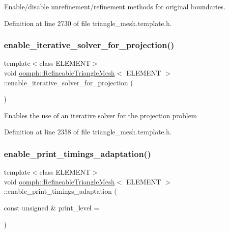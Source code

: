 Enable/disable unrefinement/refinement methods for original boundaries. 



Definition at line 2730 of file triangle\+\_\+mesh.\+template.\+h.

\mbox{\label{classoomph_1_1RefineableTriangleMesh_aa0e6f48ae67efc2931c03ca22eaa9ca0}} 
\subsubsection{\texorpdfstring{enable\+\_\+iterative\+\_\+solver\+\_\+for\+\_\+projection()}{enable\_iterative\_solver\_for\_projection()}}
{\footnotesize\ttfamily template$<$class E\+L\+E\+M\+E\+NT$>$ \\
void \hyperlink{classoomph_1_1RefineableTriangleMesh}{oomph\+::\+Refineable\+Triangle\+Mesh}$<$ E\+L\+E\+M\+E\+NT $>$\+::enable\+\_\+iterative\+\_\+solver\+\_\+for\+\_\+projection (\begin{DoxyParamCaption}{ }\end{DoxyParamCaption})\hspace{0.3cm}{\ttfamily [inline]}}

Enables the use of an iterative solver for the projection problem 

Definition at line 2358 of file triangle\+\_\+mesh.\+template.\+h.

\mbox{\label{classoomph_1_1RefineableTriangleMesh_a53f7ac7fbe9fdde0fb52b634d7370221}} 
\subsubsection{\texorpdfstring{enable\+\_\+print\+\_\+timings\+\_\+adaptation()}{enable\_print\_timings\_adaptation()}}
{\footnotesize\ttfamily template$<$class E\+L\+E\+M\+E\+NT$>$ \\
void \hyperlink{classoomph_1_1RefineableTriangleMesh}{oomph\+::\+Refineable\+Triangle\+Mesh}$<$ E\+L\+E\+M\+E\+NT $>$\+::enable\+\_\+print\+\_\+timings\+\_\+adaptation (\begin{DoxyParamCaption}\item[{const unsigned \&}]{print\+\_\+level = {} }\end{DoxyParamCaption})\hspace{0.3cm}{\ttfamily [inline]}}




